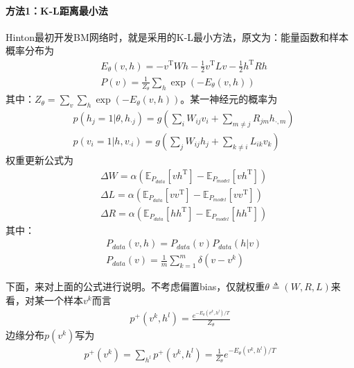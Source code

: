             \paragraph{方法1：K-L距离最小法}Hinton最初开发BM网络时，就是采用的K-L最小方法，原文为：能量函数和样本概率分布为
            \begin{align*}
            & E_\theta(v,h) = -v^\mathrm{T}Wh - \frac{1}{2} v^\mathrm{T}Lv - \frac{1}{2}h^\mathrm{T}Rh\\
            & P(v) = \frac{1}{Z_\theta}\sum_h \exp(-E_\theta(v,h) )
            \end{align*}
            其中：$Z_\theta = \sum_v\sum_h \exp(-E_\theta(v,h))$。某一神经元的概率为
            \begin{align*}
            & p(h_j=1|\theta,h_{\cdot j}) = g \left( \sum_i W_{ij}v_i+ \sum_{m\neq j}R_{jm}h_{\cdot,m} \right) \\
            & p(v_i=1|h,v_{\cdot i}) = g \left( \sum_j W_{ij}h_j+ \sum_{k\neq i}L_{ik}v_{k} \right)
            \end{align*}
            权重更新公式为
            \begin{align*}
            & \Delta W = \alpha \left( \mathbb{E}_{P_{data}}[vh^\mathrm{T}]  - \mathbb{E}_{P_{model}}[vh^\mathrm{T}] \right)\\
            & \Delta L = \alpha \left( \mathbb{E}_{P_{data}}[vv^\mathrm{T}]  - \mathbb{E}_{P_{model}}[vv^\mathrm{T}] \right)\\
            & \Delta R = \alpha \left( \mathbb{E}_{P_{data}}[hh^\mathrm{T}]  - \mathbb{E}_{P_{model}}[hh^\mathrm{T}] \right)
            \end{align*}
            其中：
            \begin{align*}
            & P_{data}(v,h) = P_{data}(v)P_{data}(h|v)\\
            & P_{data}(v) = \frac{1}{m} \sum_{k=1}^m\delta (v-v^k)
            \end{align*}
            \par
            下面，来对上面的公式进行说明。不考虑偏置bias，仅就权重$\theta\triangleq (W,R,L)$来看，对某一个样本$v^k$而言
            \begin{align*}
            p^+(v^k,h^l) = \frac{e^{-E_\theta(v^k,h^l)/T}}{Z_\theta}
            \end{align*}
            边缘分布$p(v^k)$写为
            \begin{align*}
            p^+(v^k) = \sum_{h^l}p^+(v^k,h^l) = \frac{1}{Z_\theta}e^{-E_\theta (v^k,h^l)/T}
            \end{align*}
